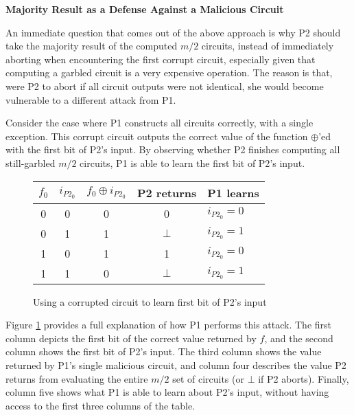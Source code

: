 \noindent\textbf{Majority Result as a Defense Against a Malicious Circuit}

An immediate question that comes out of the above approach is why \ac{P2} should take the majority result of the computed $m/2$ circuits, instead of immediately aborting when encountering the first corrupt circuit, especially given that computing a garbled circuit is a very expensive operation.  The reason is that, were \ac{P2} to abort if all circuit outputs were not identical, she would become vulnerable to a different attack from \ac{P1}.

Consider the case where \ac{P1} constructs all circuits correctly, with a single exception.  This corrupt circuit outputs the correct value of the function $\oplus$'ed with the first bit of \ac{P2}'s input.  By observing whether \ac{P2} finishes computing all still-garbled $m/2$ circuits, \ac{P1} is able to learn the first bit of \ac{P2}'s input.

\begin{figure}[t]
    \centering
    \begin{tabular}{ c | c | c | c | l }
        \hline
        $f_0$ & $i_{P2_0}$ & $f_0 \oplus i_{P2_0}$ & \ac{P2} returns & \ac{P1} learns \\
        \hline
        0 & 0 & 0 & 0 & $i_{P2_0} = 0$\\
        \hline
        0 & 1 & 1 & $\bot$ & $i_{P2_0} = 1$\\
        \hline
        1 & 0 & 1 & 1 & $i_{P2_0} = 0$\\
        \hline
        1 & 1 & 0 & $\bot$ & $i_{P2_0} = 1$\\
        \hline
    \end{tabular}
    \caption{Using a corrupted circuit to learn first bit of \ac{P2}'s input}
    \label{fig:earlyabortattack}
\end{figure}

Figure \ref{fig:earlyabortattack} provides a full explanation of how \ac{P1} performs this attack.  The first column depicts the first bit of the correct value returned by $f$, and the second column shows the first bit of \ac{P2}'s input.  The third column shows the value returned by \ac{P1}'s single malicious circuit, and column four describes the value \ac{P2} returns from evaluating the entire $m/2$ set of circuits (or $\bot$ if \ac{P2} aborts).  Finally, column five shows what \ac{P1} is able to learn about \ac{P2}'s input, without having access to the first three columns of the table.


